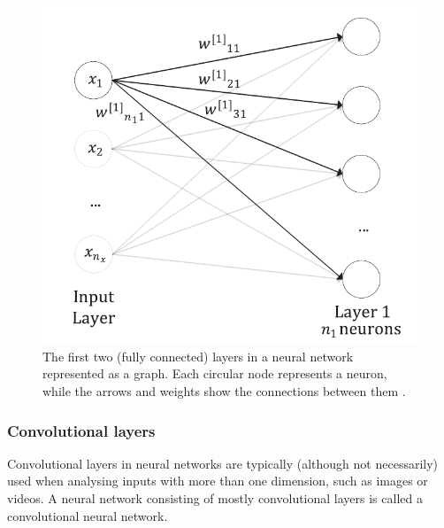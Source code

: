 \documentclass[11pt,a4paper,onecolumn]{report}
\begin{document}
\begin{figure}[t]
  \centering
  \includegraphics[width=0.5\linewidth]{ann.png}
  \caption{The first two (fully connected) layers in a neural network
  represented as a graph. Each circular node represents a neuron, while the
  arrows and weights show the connections between them \citep{michelucci2018}.}
  \label{fig:fully_connected}
\end{figure}

\subsubsection{Convolutional layers}
Convolutional layers in neural networks are typically (although not necessarily)
used when analysing inputs with more than one dimension, such as images or
videos. A neural network consisting of mostly convolutional layers is called a
convolutional neural network. \\
\end{document}
